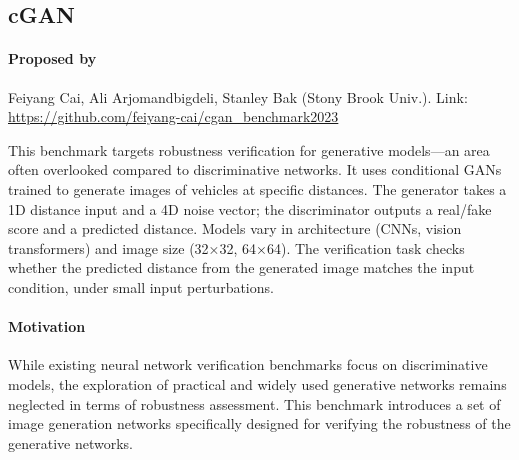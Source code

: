 \documentclass[oneside,11pt,dvipsnames]{book}
\numberwithin{equation}{section}
\theoremstyle{definition}
\theoremstyle{remark}
\begin{document}


\subsection{cGAN}
\paragraph*{Proposed by} Feiyang Cai, Ali Arjomandbigdeli, Stanley Bak (Stony Brook Univ.). Link: \url{https://github.com/feiyang-cai/cgan_benchmark2023}

This benchmark targets robustness verification for generative models—an area often overlooked compared to discriminative networks.
It uses conditional GANs trained to generate images of vehicles at specific distances. The generator takes a 1D distance input and a 4D noise vector; the discriminator outputs a real/fake score and a predicted distance.
Models vary in architecture (CNNs, vision transformers) and image size (32×32, 64×64).
The verification task checks whether the predicted distance from the generated image matches the input condition, under small input perturbations.


\paragraph*{Motivation}
While existing neural network verification benchmarks focus on discriminative models, the exploration of practical and widely used generative networks remains neglected in terms of robustness assessment.
This benchmark introduces a set of image generation networks specifically designed for verifying the robustness of the generative networks.
\end{document}
